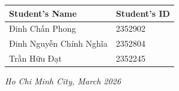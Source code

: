 \begin{titlepage}
    \begin{center}
        \begin{tabular}{ll}
            \hline
            \textbf{Student's Name} & \textbf{Student's ID} \\
            \hline
            Đinh Chấn Phong         & 2352902               \\
            Đinh Nguyễn Chính Nghĩa & 2352804               \\
            Trần Hữu Đạt            & 2352245               \\
            \hline
        \end{tabular}
    \end{center}

    \vspace{1cm}

    \begin{center}
        {\em Ho Chi Minh City, March 2026}
    \end{center}
\end{titlepage}
